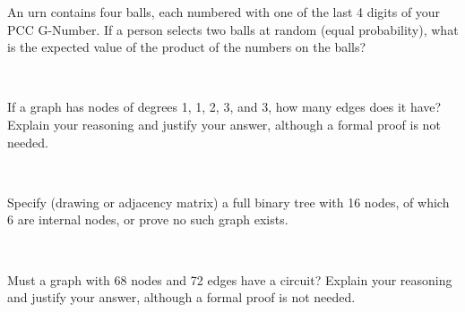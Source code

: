 \documentclass[10pt,letterpaper, cm]{hmcpset}
\begin{document}
\begin{problem}[11]
  An urn contains four balls, each numbered with one of the last 4 digits
  of your PCC G-Number. If a person selects two balls at random (equal
  probability), what is the expected value of the product of the numbers on
  the balls?
\end{problem}\\

\begin{problem}[12]
   If a graph has nodes of degrees 1, 1, 2, 3, and 3, how many edges does it
   have? Explain your reasoning and justify your answer, although a formal
   proof is not needed.
\end{problem}\\

\begin{problem}[13]
   Specify (drawing or adjacency matrix) a full binary tree with 16 nodes, of
   which 6 are internal nodes, or prove no such graph exists.   
\end{problem}\\

\begin{problem}[14]
  Must a graph with 68 nodes and 72 edges have a circuit? Explain your
  reasoning and justify your answer, although a formal proof is not needed.  
\end{problem}\\

\begin{problem}[15]
  
\end{problem}\\
\end{document}
